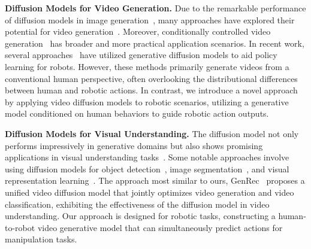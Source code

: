 \vspace{0.1cm}
\noindent\textbf{Diffusion Models for Video Generation.} 
Due to the remarkable performance of diffusion models in image generation~\cite{dalle2,ldm,glide,imagen,ediffi}, many approaches have explored their potential for video generation~\cite{vdm,gen1,align,tuneavideo,text2videozero,simda,tu2024motioneditor,tu2024motionfollower,tu2024stableanimator}. Moreover, conditionally controlled video generation~\cite{LFDM,dreampose,disco,hu2024animate, vidiff} has broader and more practical application scenarios.
In recent work, several approaches~\cite{cheang2024gr,wu2023unleashing,gen2act} have utilized generative diffusion models to aid policy learning for robots. However, these methods primarily generate videos from a conventional human perspective, often overlooking the distributional differences between human and robotic actions.
In contrast, we introduce a novel approach by applying video diffusion models to robotic scenarios, utilizing a generative model conditioned on human behaviors to guide robotic action outputs.

\vspace{0.1cm}
\noindent\textbf{Diffusion Models for Visual Understanding.}
The diffusion model not only performs impressively in generative domains but also shows promising applications in visual understanding tasks~\cite{yu2024representation, senane2024self, luo2024learning, instructdiffusion}. Some notable approaches involve using diffusion models for object detection~\cite{diffusiondet}, image segmentation~\cite{xu2023open}, and visual representation learning~\cite{yu2024representation, chen2024deconstruct}.  The approach most similar to ours, GenRec~\cite{weng2024genrec} proposes a unified video diffusion model that jointly optimizes video generation and video classification, exhibiting the effectiveness of the diffusion model in video understanding. Our approach is designed for robotic tasks, constructing a human-to-robot video generative model that can simultaneously predict actions for manipulation tasks.

